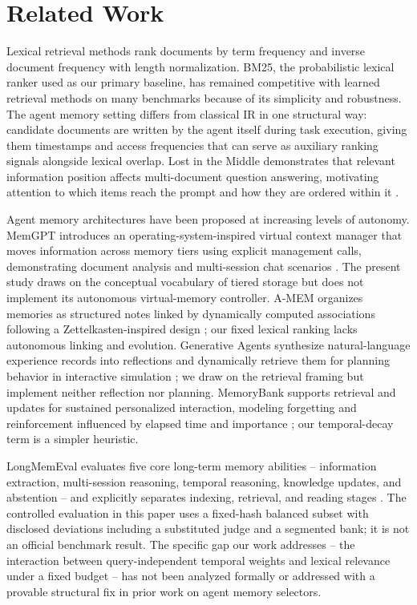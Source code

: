 \section{Related Work}

\label{sec:related_work}

Lexical retrieval methods rank documents by term frequency and inverse document frequency with length normalization. BM25, the probabilistic lexical ranker used as our primary baseline, has remained competitive with learned retrieval methods on many benchmarks because of its simplicity and robustness. The agent memory setting differs from classical IR in one structural way: candidate documents are written by the agent itself during task execution, giving them timestamps and access frequencies that can serve as auxiliary ranking signals alongside lexical overlap. Lost in the Middle demonstrates that relevant information position affects multi-document question answering, motivating attention to which items reach the prompt and how they are ordered within it \citep{ref_9dbf664b6954efbc}.

Agent memory architectures have been proposed at increasing levels of autonomy. MemGPT introduces an operating-system-inspired virtual context manager that moves information across memory tiers using explicit management calls, demonstrating document analysis and multi-session chat scenarios \citep{ref_959d6858d034c6e1}. The present study draws on the conceptual vocabulary of tiered storage but does not implement its autonomous virtual-memory controller. A-MEM organizes memories as structured notes linked by dynamically computed associations following a Zettelkasten-inspired design \citep{ref_1aacba116cbe3c5b}; our fixed lexical ranking lacks autonomous linking and evolution. Generative Agents synthesize natural-language experience records into reflections and dynamically retrieve them for planning behavior in interactive simulation \citep{ref_6e953134a3c04402}; we draw on the retrieval framing but implement neither reflection nor planning. MemoryBank supports retrieval and updates for sustained personalized interaction, modeling forgetting and reinforcement influenced by elapsed time and importance \citep{ref_713e886950406893}; our temporal-decay term is a simpler heuristic.

LongMemEval evaluates five core long-term memory abilities -- information extraction, multi-session reasoning, temporal reasoning, knowledge updates, and abstention -- and explicitly separates indexing, retrieval, and reading stages \citep{ref_ab2c226739f2f52a}. The controlled evaluation in this paper uses a fixed-hash balanced subset with disclosed deviations including a substituted judge and a segmented bank; it is not an official benchmark result. The specific gap our work addresses -- the interaction between query-independent temporal weights and lexical relevance under a fixed budget -- has not been analyzed formally or addressed with a provable structural fix in prior work on agent memory selectors.
